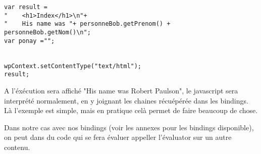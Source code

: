 \begin{lstlisting}
var result =
"    <h1>Index</h1>\n"+
"    His name was "+ personneBob.getPrenom() + personneBob.getNom()\n";
var ponay ="";


wpContext.setContentType("text/html");
result;
\end{lstlisting}



A l'éxécution sera affiché "His name was Robert Paulson", le javascript sera interprété
normalement, en y joignant les chaines récuépérée dans les bindings. Là l'exemple
est simple, mais en pratique celà permet de faire beaucoup de chose.

Dans notre cas avec nos bindings (voir les annexes pour les bindings disponible),
on peut dans du code qui se fera évaluer appeller l'évaluator sur un autre contenu.




